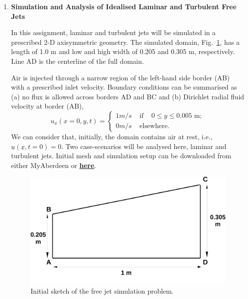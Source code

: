 \documentclass[12pts,a4paper,amsmath,amssymb,floatfix]{article}%
\renewcommand\leq{\leqslant}
\begin{document}
\begin{enumerate}[label=\bfseries Problem \arabic*:]
   \item\label{Problem1} {\bf Simulation and Analysis of Idealised Laminar and Turbulent Free Jets}

In this assignment, laminar and turbulent jets will be simulated in a prescribed 2-D axisymmetric geometry. The simulated domain, Fig.~\ref{EG501V_Assignment:Sketch_Sketch}, has a length of 1.0 m and low and high width of 0.205 and 0.305 m, respectively. Line AD is the centerline of the full domain. 

          Air is injected through a narrow region of the left-hand side border (AB) with a prescribed inlet velocity. Boundary conditions can be summarised as (a) no flux is allowed across borders AD and BC and (b) Dirichlet radial fluid velocity at border (AB),
         \[ u_{x}( x=0, y, t) = \begin{cases}
             1 m/s & \text{ if } \;\;\;0\leq y\leq 0.005 \text{ m}; \\
             0 m/s & \text{ elsewhere.}
         \end{cases}\]  
         We can consider that, initially, the domain contains air at rest, i.e., $\underline{u}\left(\underline{x},t=0\right)=0$. Two case-scenarios will be analysed here, laminar and turbulent jets. Initial mesh and simulation setup can be downloaded from either MyAberdeen or \href{https://www.dropbox.com/s/d732xcpmyfkfqgy/FreeJet_Initial_Files.zip?dl=0}{{\bf here}}.

\begin{figure}[h]
\begin{center}
\includegraphics[width=15.cm,height=8.cm,clip]{./Pics/Sketch_Prob1b}
\caption{Initial sketch of the free jet simulation problem. }
\label{EG501V_Assignment:Sketch_Sketch}
\end{center}
\end{figure}


\end{enumerate}
\end{document}

